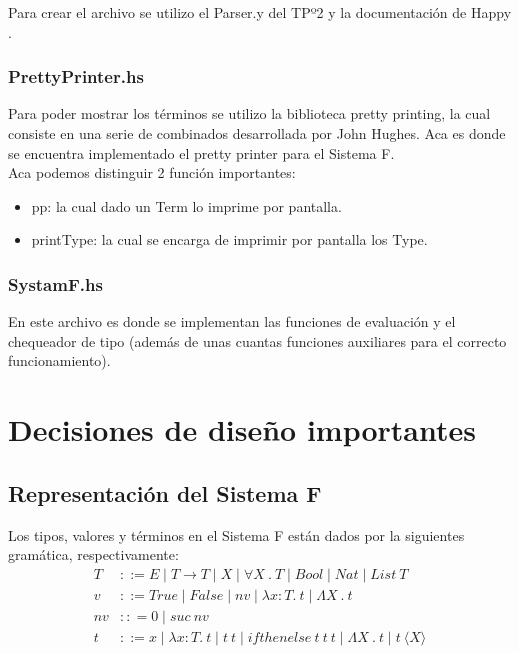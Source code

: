 \documentclass[12pt, titlepage, a4paper]{article}
\begin{document}
Para crear el archivo se utilizo el Parser.y del TPº2 \cite{tp2:lambdaCalculoSimpleTipado} y la documentación de Happy \cite{haskellHappy}.

\subsubsection{PrettyPrinter.hs}
Para poder mostrar los términos se utilizo la biblioteca pretty printing, la cual consiste en una serie de combinados desarrollada por John Hughes. Aca es 
donde se encuentra implementado el pretty printer para el Sistema F. \\
Aca podemos distinguir 2 función importantes:
\begin{itemize}[label=$\bullet$]
  \item {pp: la cual dado un Term lo imprime por pantalla.}
  \item {printType: la cual se encarga de imprimir por pantalla los Type.}
\end{itemize}

\subsubsection{SystamF.hs}
En este archivo es donde se implementan las funciones de evaluación y el chequeador de tipo (además de unas cuantas funciones auxiliares 
para el correcto funcionamiento).

\section{Decisiones de diseño importantes}
\subsection{Representación del Sistema F}
Los tipos, valores y términos en el Sistema F están dados por la siguientes gramática, respectivamente:
\begin{align*}
    T &::= E \mid T \rightarrow T \mid X \mid \forall X \ . \ T \mid Bool \mid Nat \mid List \ T\\
    v &::= True \mid False \mid nv \mid \lambda x:T. \ t \mid \Lambda X \ . \ t \\
    nv &:: = 0 \mid suc \ nv \\
    t &::= x \mid \lambda x:T. \ t \mid t \ t \mid ifthenelse \ t \ t \ t \mid \Lambda X \ . \ t \mid t \ \langle X \rangle \\
\end{align*}
\end{document}
